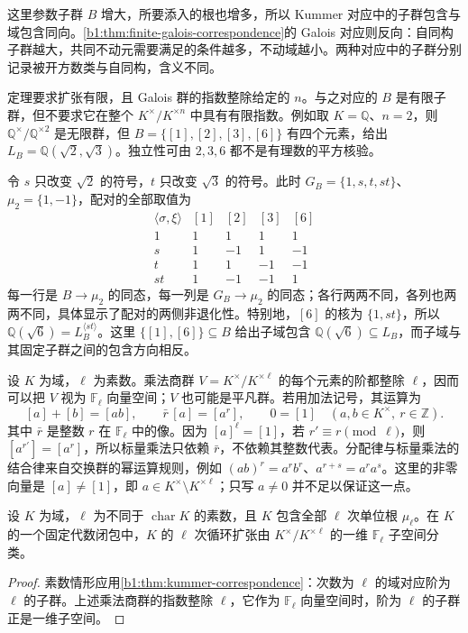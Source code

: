 这里参数子群 \(B\) 增大，所要添入的根也增多，所以 Kummer 对应中的子群包含与域包含同向。\cref{b1:thm:finite-galois-correspondence}的 Galois 对应则反向：自同构子群越大，共同不动元需要满足的条件越多，不动域越小。两种对应中的子群分别记录被开方数类与自同构，含义不同。

\ProseParagraphBreak
定理要求扩张有限，且 Galois 群的指数整除给定的 \(n\)。与之对应的 \(B\) 是有限子群，但不要求它在整个 \(K^\times/K^{\times n}\) 中具有有限指数。例如取 \(K=\mathbb Q\)、\(n=2\)，则 \(\mathbb Q^\times/\mathbb Q^{\times2}\) 是无限群，但 \(B=\{[1],[2],[3],[6]\}\) 有四个元素，给出 \(L_B=\mathbb Q(\sqrt2,\sqrt3)\)。独立性可由 \(2,3,6\) 都不是有理数的平方核验。

\ProseParagraphBreak
令 \(s\) 只改变 \(\sqrt2\) 的符号，\(t\) 只改变 \(\sqrt3\) 的符号。此时 \(G_B=\{1,s,t,st\}\)、\(\mu_2=\{1,-1\}\)，配对的全部取值为
\[
	\begin{array}{c|rrrr}
		\langle\sigma,\xi\rangle &[1]&[2]&[3]&[6]\\ \hline 1  & 1& 1& 1& 1\\
		s  & 1&-1& 1&-1\\
		t  & 1& 1&-1&-1\\
		st & 1&-1&-1& 1
	\end{array}
\]
每一行是 \(B\rightarrow\mu_2\) 的同态，每一列是 \(G_B\rightarrow\mu_2\) 的同态；各行两两不同，各列也两两不同，具体显示了配对的两侧非退化性。特别地，\([6]\) 的核为 \(\{1,st\}\)，所以 \(\mathbb Q(\sqrt6)=L_B^{\langle st\rangle}\)。这里 \(\{[1],[6]\}\subseteq B\) 给出子域包含 \(\mathbb Q(\sqrt6)\subseteq L_B\)，而子域与其固定子群之间的包含方向相反。

\ProseParagraphBreak
设 \(K\) 为域，\(\ell\) 为素数。乘法商群 \(V=K^\times/K^{\times\ell}\) 的每个元素的阶都整除 \(\ell\)，因而可以把 \(V\) 视为 \(\mathbb F_\ell\) 向量空间；\(V\) 也可能是平凡群。若用加法记号，其运算为
\[
	[a]+[b]=[ab],\qquad \bar r\,[a]=[a^r],\qquad 0=[1] \quad(a,b\in K^\times,\ r\in\mathbb Z).
\]
其中 \(\bar r\) 是整数 \(r\) 在 \(\mathbb F_\ell\) 中的像。因为 \([a]^\ell=[1]\)，若 \(r'\equiv r\pmod\ell\)，则 \([a^{r'}]=[a^r]\)，所以标量乘法只依赖 \(\bar r\)，不依赖其整数代表。分配律与标量乘法的结合律来自交换群的幂运算规则，例如 \((ab)^r=a^rb^r\)、\(a^{r+s}=a^ra^s\)。这里的非零向量是 \([a]\ne[1]\)，即 \(a\in K^\times\setminus K^{\times\ell}\)；只写 \(a\ne0\) 并不足以保证这一点。


\begin{corollary}\label{b1:cor:kummer-prime-classification}
	设 \(K\) 为域，\(\ell\) 为不同于 \(\operatorname{char}K\) 的素数，且 \(K\) 包含全部 \(\ell\) 次单位根 \(\mu_\ell\)。在 \(K\) 的一个固定代数闭包中，\(K\) 的 \(\ell\) 次循环扩张由 \(K^\times/K^{\times\ell}\) 的一维 \(\mathbb F_\ell\) 子空间分类。
\end{corollary}
\begin{proof}
	素数情形应用\cref{b1:thm:kummer-correspondence}：次数为 \(\ell\) 的域对应阶为 \(\ell\) 的子群。上述乘法商群的指数整除 \(\ell\)，它作为 \(\mathbb F_\ell\) 向量空间时，阶为 \(\ell\) 的子群正是一维子空间。
\end{proof}

